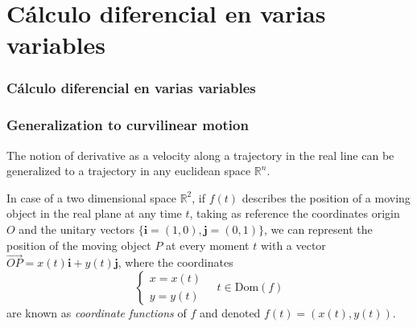 \section{Cálculo diferencial en varias variables}
\begin{frame}
\frametitle{Cálculo diferencial en varias variables}
\tableofcontents[sectionstyle=show/hide,hideothersubsections]
\end{frame}


\begin{frame}
\frametitle{Generalization to curvilinear motion}
The notion of derivative as a velocity along a trajectory in the real line can be generalized to a trajectory in any euclidean space $\mathbb{R}^n$.

In case of a two dimensional space $\mathbb{R}^2$, if $f(t)$ describes the position of a moving object in the real plane at any time $t$, taking as reference the coordinates origin $O$ and the unitary vectors $\{\mathbf{i}=(1,0),\mathbf{j}=(0,1)\}$, we can represent the position of the moving object $P$ at every moment $t$ with a vector $\vec{OP}=x(t)\mathbf{i}+y(t)\mathbf{j}$, where the coordinates 
\[
\begin{cases}
x=x(t)\\
y=y(t)
\end{cases}
\quad
t\in \mbox{Dom}(f)
\]
are known as \emph{coordinate functions} of $f$ and denoted $f(t)=(x(t),y(t))$.

\begin{center}
\end{center}
\end{frame}


